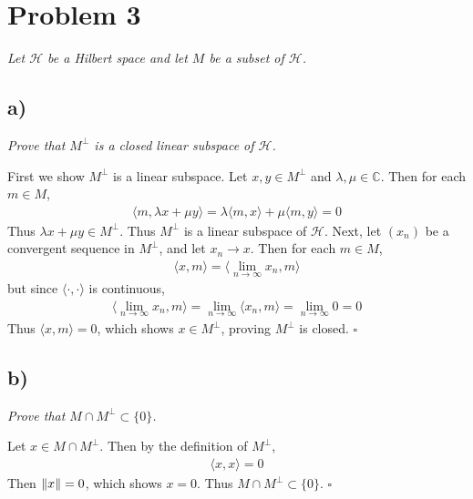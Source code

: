 \documentclass[12pt]{article}
\theoremstyle{plain}
\begin{document}
\section*{Problem 3}
\emph{Let $\mathcal{H}$ be a Hilbert space and let $M$ be a subset of $\mathcal{H}$.} \medskip

\subsection*{ a)}
\emph{Prove that $M^\perp$ is a closed linear subspace of $\mathcal{H}$.}

First we show $M^\perp$ is a linear subspace.  Let $x, y \in M^\perp$ and $\lambda, \mu \in \mathbb{C}$.  Then for each $m \in M$,
\begin{align*}
    \langle m, \lambda x + \mu y\rangle = \lambda\langle m, x\rangle + \mu\langle m, y\rangle = 0
\end{align*}
Thus $\lambda x + \mu y \in M^\perp$.  Thus $M^\perp$ is a linear subspace of $\mathcal{H}$.  Next, let $(x_n)$ be a convergent sequence in $M^\perp$, and let $x_n \rightarrow x$.  Then for each $m \in M$,
\begin{align*}
    \langle x, m \rangle = \langle \lim_{n\rightarrow \infty} x_n, m\rangle
\end{align*}
but since $\langle \cdot, \cdot \rangle$ is continuous,
\begin{align*}
    \langle \lim_{n\rightarrow \infty} x_n, m\rangle = \lim_{n\rightarrow \infty}\langle x_n, m\rangle = \lim_{n\rightarrow \infty} 0 = 0
\end{align*}
Thus $\langle x, m \rangle = 0$, which shows $x \in M^\perp$, proving $M^\perp$ is closed. \hfill $\square$

\subsection*{ b)}
\emph{Prove that $M \cap M^\perp \subset \{0\}$.} \medskip

Let $x \in M \cap M^\perp$.  Then by the definition of $M^\perp$,
\begin{align*}
    \langle x, x\rangle = 0
\end{align*}
Then $\norm{x} = 0$, which shows $x = 0$.  Thus $M \cap M^\perp \subset \{0\}$. \hfill $\square$

\end{document}

